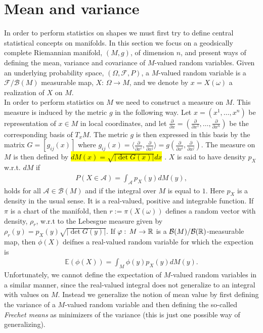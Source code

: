 \section{Mean and variance}
\label{sec:mean_and_variance}

In order to perform statistics on shapes we must first try to define central statistical concepts on manifolds. In this section we focus on a geodsically complete Riemannian manifold, $(M, g)$, of dimension $n$, and present ways of defining the mean, variance and covariance of $M$-valued random variables. Given an underlying probability space, $(\Omega, \mathcal{F}, P)$, a $M$-valued random variable is a $\mathcal{F}/\mathcal{B}(M)$ measurable map, $X: \, \Omega \rightarrow M$, and we denote by $x = X(\omega)$ a realization of $X$ on $M$.\\[0.2 cm]
In order to perform statistics on $M$ we need to construct a measure on $M$. This measure is induced by the metric $g$ in the following way. Let $x = (x^1, \ldots , x^n)$ be representation of $x \in M$ in local coordinates, and let $\frac{\partial}{\partial x} = (\frac{\partial}{\partial x^1}, \ldots , \frac{\partial}{\partial x^n})$ be the corresponding basis of $T_x M$. The metric $g$ is then expressed in this basis by the matrix $G = [g_{ij}(x)]$ where $g_{ij}(x) = \langle \frac{\partial}{\partial x^i} , \frac{\partial}{\partial x^j} \rangle = g\left(\frac{\partial}{\partial x^i}, \frac{\partial}{\partial x^j}\right)$. The measure on $M$ is then defined by \hl{ $d M(x) = \sqrt{\left| \det G(x) \right|} dx$ }. $X$ is said to have density $p_X$ w.r.t. $d M$ if
\begin{align*}
P(X \in \mathcal{A}) = \int_{\mathcal{A}} p_X(y) d M(y),
\end{align*}
holds for all $\mathcal{A} \in \mathcal{B}(M)$ and if the integral over $M$ is equal to $1$. Here
$p_X$ is a density in the usual sense. It is a real-valued, positive and integrable function. If $\pi$ is a chart of the manifold, then $r := \pi(X(\omega))$ defines a random vector with density, $\rho_r$, w.r.t to the Lebesgue measure given by $\rho_r (y) = p_X (y) \sqrt{\left| \det G(y) \right|}$. If $\varphi: \, M \rightarrow \mathbb{R}$ is a $\mathcal{B}(M)/ \mathcal{B}(\mathbb{R})$-measurable map, then $\phi(X)$ deifnes a real-valued random variable for which the expection is
\begin{align*}
\mathbb{E} (\phi(X)) = \int_M \phi(y) p_X(y) d M(y).
\end{align*}
Unfortunately, we cannot define the expectation of $M$-valued random variables in a similar manner, since the real-valued integral does not generalize to an integral with values on $M$. Instead we generalize the notion of mean value by first defining the variance of a $M$-valued random variable and then defining the so-called \textit{Frechet means} as minimizers of the variance (this is just one possible way of generalizing). 

